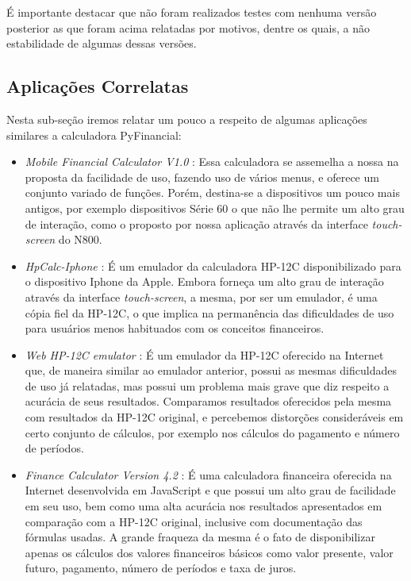 É importante destacar que não foram realizados testes com nenhuma versão posterior as que foram acima relatadas por motivos, dentre os quais, a não estabilidade de algumas dessas versões.


\subsection{Aplicações Correlatas}


Nesta sub-seção iremos relatar um pouco a respeito de algumas aplicações similares a calculadora PyFinancial:

\begin{itemize}

 \item \textit{Mobile Financial Calculator V1.0} \cite{mobcalc}: Essa calculadora se assemelha a nossa na proposta da facilidade de uso, fazendo uso de vários menus, e oferece um conjunto variado de funções. Porém, destina-se a dispositivos um pouco mais antigos, por exemplo dispositivos Série 60 \cite{s60} o que não lhe permite um alto grau de interação, como o proposto por nossa aplicação através da interface \textit{touch-screen} do N800.

 \item \textit{HpCalc-Iphone} \cite{hpiphone}: É um emulador da calculadora HP-12C disponibilizado para o dispositivo Iphone da Apple. Embora forneça um alto grau de interação através da interface \textit{touch-screen}, a mesma, por ser um emulador, é uma cópia fiel da HP-12C, o que implica na permanência das dificuldades de uso para usuários menos habituados com os conceitos financeiros.

 \item \textit{Web HP-12C emulator} \cite{epxcalc}: É um emulador da HP-12C oferecido na Internet que, de maneira similar ao emulador anterior, possui as mesmas dificuldades de uso já relatadas, mas possui um problema mais grave que diz respeito a acurácia de seus resultados. Comparamos resultados oferecidos pela mesma com resultados da HP-12C original, e percebemos distorções consideráveis em certo conjunto de cálculos, por exemplo nos cálculos do pagamento e número de períodos.

 \item \textit{Finance Calculator Version 4.2} \cite{arachnoid}: É uma calculadora financeira oferecida na Internet desenvolvida em JavaScript e que possui um alto grau de facilidade em seu uso, bem como uma alta acurácia nos resultados apresentados em comparação com a HP-12C original, inclusive com documentação das fórmulas usadas. A grande fraqueza da mesma é o fato de disponibilizar apenas os cálculos dos valores financeiros básicos como valor presente, valor futuro, pagamento, número de períodos e taxa de juros.

\end{itemize}

